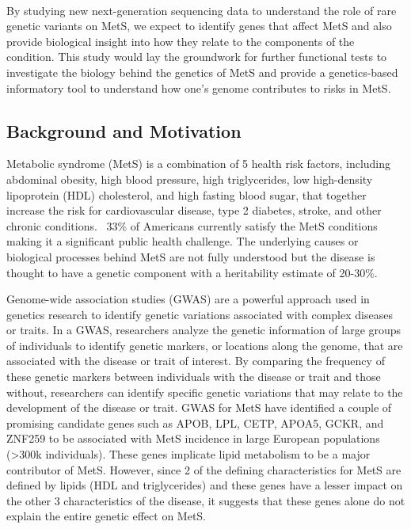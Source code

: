 \documentclass[11pt]{article}
\begin{document}
\

By studying new next-generation sequencing data to understand the role of rare genetic variants on MetS, we expect to identify genes that affect MetS and also provide biological insight into how they relate to the components of the condition. This study would lay the groundwork for further functional tests to investigate the biology behind the genetics of MetS and provide a genetics-based informatory tool to understand how one's genome contributes to risks in MetS.

\newpage

\subsection*{Background and Motivation}

Metabolic syndrome (MetS) is a combination of 5 health risk factors, including abdominal obesity, high blood pressure, high triglycerides, low high-density lipoprotein (HDL) cholesterol, and high fasting blood sugar, that together increase the risk for cardiovascular disease, type 2 diabetes, stroke, and other chronic conditions. ~33\% of Americans currently satisfy the MetS conditions making it a significant public health challenge. The underlying causes or biological processes behind MetS are not fully understood but the disease is thought to have a genetic component with a heritability estimate of 20-30\%. 

Genome-wide association studies (GWAS) are a powerful approach used in genetics research to identify genetic variations associated with complex diseases or traits. In a GWAS, researchers analyze the genetic information of large groups of individuals to identify genetic markers, or locations along the genome, that are associated with the disease or trait of interest. By comparing the frequency of these genetic markers between individuals with the disease or trait and those without, researchers can identify specific genetic variations that may relate to the development of the disease or trait. GWAS for MetS have identified a couple of promising candidate genes such as APOB, LPL, CETP, APOA5, GCKR, and ZNF259 to be associated with MetS incidence in large European populations (>300k individuals). These genes implicate lipid metabolism to be a major contributor of MetS. However, since 2 of the defining characteristics for MetS are defined by lipids (HDL and triglycerides) and these genes have a lesser impact on the other 3 characteristics of the disease, it suggests that these genes alone do not explain the entire genetic effect on MetS.
\end{document}
